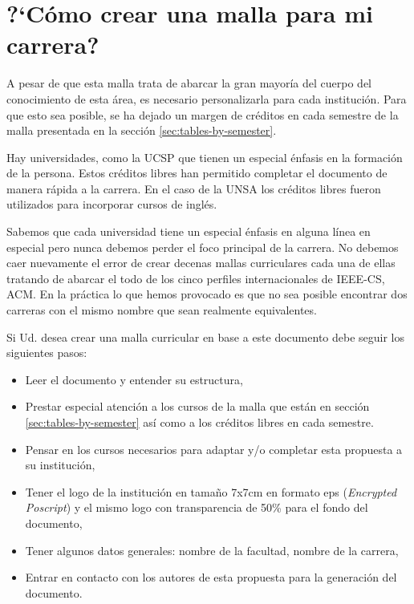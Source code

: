 \section*{?`Cómo crear una malla para mi carrera?}
%

A pesar de que esta malla trata de abarcar la gran mayoría del cuerpo del conocimiento de esta área,  
es necesario personalizarla para cada institución. Para que esto sea posible, se ha dejado un 
margen de créditos en cada semestre de la malla presentada en la sección \ref{sec:tables-by-semester}.

Hay universidades, como la \acf{UCSP} que tienen un especial énfasis en la formación de la persona. 
Estos créditos libres han permitido completar el documento de manera rápida a la carrera. 
En el caso de la \acf{UNSA} los créditos libres fueron utilizados para incorporar cursos de inglés. 

Sabemos que cada universidad tiene un especial énfasis en alguna línea en especial pero nunca 
debemos perder el foco principal de la carrera. No debemos caer nuevamente el error de crear 
decenas mallas curriculares cada una de ellas tratando de abarcar el todo de los cinco perfiles 
internacionales de IEEE-CS, ACM. En la práctica lo que hemos provocado es que no sea posible 
encontrar dos carreras con el mismo nombre que sean realmente equivalentes. 

Si Ud. desea crear una malla curricular en base a este documento debe seguir los siguientes pasos:

\begin{itemize}
\item Leer el documento y entender su estructura,
\item Prestar especial atención a los cursos de la malla que están en sección \ref{sec:tables-by-semester} 
      así como a los créditos libres en cada semestre.
\item Pensar en los cursos necesarios para adaptar y/o completar esta propuesta a su institución,
\item Tener el logo de la institución en tamaño 7x7cm en formato eps (\textit{Encrypted Poscript}) y 
      el mismo logo con transparencia de 50\% para el fondo del documento,
\item Tener algunos datos generales: nombre de la facultad, nombre de la carrera, 
\item Entrar en contacto con los autores de esta propuesta para la generación del documento.
\end{itemize}
